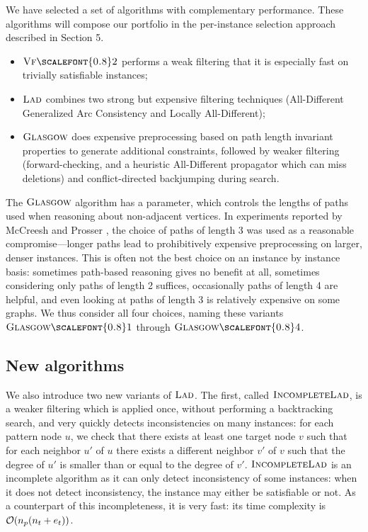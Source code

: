 \documentclass{llncs}
\newcommand{\VFtwo}{$\textsc{Vf{\scalefont{0.8}2}}$\xspace}
\newcommand{\Glasgow}{$\textsc{Glasgow}$\xspace}
\newcommand{\LAD}{$\textsc{Lad}$\xspace}
\newcommand{\IncompleteLAD}{$\textsc{IncompleteLad}$\xspace}
\newcommand{\GlasgowOne}{$\textsc{Glasgow{\scalefont{0.8}1}}$\xspace}
\newcommand{\GlasgowFour}{$\textsc{Glasgow{\scalefont{0.8}4}}$\xspace}
\begin{document}
We have selected a set of algorithms with complementary performance. These algorithms will compose our portfolio in the per-instance selection approach described in Section 5. 
\begin{itemize}
\item \VFtwo \cite{Cordella:2004} performs a weak filtering that it is especially fast on
    trivially satisfiable instances;
\item \LAD \cite{Solnon:2010} combines two strong but expensive filtering techniques
    (All-Different Generalized Arc Consistency and Locally All-Different);
\item \Glasgow \cite{McCreesh:2015} does expensive preprocessing based on path length
    invariant properties to generate additional constraints, followed by weaker filtering
    (forward-checking, and a heuristic All-Different propagator which can miss deletions) and
    conflict-directed backjumping during search.
\end{itemize}

\noindent The \Glasgow algorithm has a parameter, which controls the lengths of paths used when
reasoning about non-adjacent vertices.  In experiments reported by McCreesh and Prosser
\cite{McCreesh:2015}, the choice of paths of length 3 was used as a reasonable compromise---longer
paths lead to prohibitively expensive preprocessing on larger, denser instances. This is often not
the best choice on an instance by instance basis: sometimes path-based reasoning gives no benefit at
all, sometimes considering only paths of length 2 suffices, occasionally paths of length 4 are
helpful, and even looking at paths of length 3 is relatively expensive on some graphs. We thus consider all
four choices, naming these variants \GlasgowOne through \GlasgowFour.

\subsection{New algorithms}

We also introduce two new variants of \LAD. The first, called \IncompleteLAD, is a weaker
filtering which is applied once, without performing a backtracking search, and very quickly
detects inconsistencies on many instances: for each pattern node $u$, we check that there exists at
least one target node $v$ such that for each neighbor $u'$ of $u$ there exists a different neighbor
$v'$ of $v$ such that the degree of $u'$ is smaller than or equal to the degree of $v'$.
\IncompleteLAD is an incomplete algorithm as it can only detect inconsistency of some instances: when
it does not detect inconsistency, the instance may either be satisfiable or not. As a counterpart of
this incompleteness, it is very fast: its time complexity is ${\cal O}(n_p(n_t+e_t))$.
\end{document}
